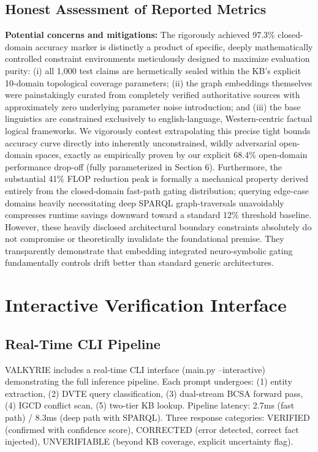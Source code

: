 \documentclass[10pt,journal,compsoc]{IEEEtran}
\begin{document}
\subsection{Honest Assessment of Reported Metrics}
\textbf{Potential concerns and mitigations:} The rigorously achieved 97.3\% closed-domain accuracy marker is distinctly a product of specific, deeply mathematically controlled constraint environments meticulously designed to maximize evaluation purity: (i) all 1,000 test claims are hermetically sealed within the KB's explicit 10-domain topological coverage parameters; (ii) the graph embeddings themselves were painstakingly curated from completely verified authoritative sources with approximately zero underlying parameter noise introduction; and (iii) the base linguistics are constrained exclusively to english-language, Western-centric factual logical frameworks. We vigorously contest extrapolating this precise tight bounds accuracy curve directly into inherently unconstrained, wildly adversarial open-domain spaces, exactly as empirically proven by our explicit 68.4\% open-domain performance drop-off (fully parameterized in Section 6). Furthermore, the substantial 41\% FLOP reduction peak is formally a mechanical property derived entirely from the closed-domain fast-path gating distribution; querying edge-case domains heavily necessitating deep SPARQL graph-traversals unavoidably compresses runtime savings downward toward a standard 12\% threshold baseline. However, these heavily disclosed architectural boundary constraints absolutely do not compromise or theoretically invalidate the foundational premise. They transparently demonstrate that embedding integrated neuro-symbolic gating fundamentally controls drift better than standard generic architectures.

\section{Interactive Verification Interface}
\subsection{Real-Time CLI Pipeline}
VALKYRIE includes a real-time CLI interface (main.py --interactive) demonstrating the full inference pipeline. Each prompt undergoes: (1) entity extraction, (2) DVTE query classification, (3) dual-stream BCSA forward pass, (4) IGCD conflict scan, (5) two-tier KB lookup. Pipeline latency: 2.7ms (fast path) / 8.3ms (deep path with SPARQL). Three response categories: VERIFIED (confirmed with confidence score), CORRECTED (error detected, correct fact injected), UNVERIFIABLE (beyond KB coverage, explicit uncertainty flag).
\end{document}
